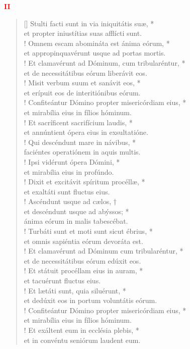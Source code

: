\begin{center}
\textcolor{red}{\bf II}
\end{center}
\begin{verse}[\versewidth]
Stulti facti sunt in via iniquitátis suæ, *\\
et propter iniustítias suas afflícti sunt.\\!
\vin Omnem escam abomináta est ánima eórum, *\\
\vin et appropinquavérunt usque ad portas mortis.\\!
Et clamavérunt ad Dóminum, cum tribularéntur, *\\
et de necessitátibus eórum liberávit eos.\\!
\vin Misit verbum suum et sanávit eos, *\\
\vin et erípuit eos de interitiónibus eórum.\\!
Confiteántur Dómino propter misericórdiam eius, *\\
et mirabília eius in fílios hóminum.\\!
\vin Et sacríficent sacrifícium laudis, *\\
\vin et annúntient ópera eius in exsultatióne.\\!
Qui descéndunt mare in návibus, *\\
faciéntes operatiónem in aquis multis.\\!
\vin Ipsi vidérunt ópera Dómini, *\\
\vin et mirabília eius in profúndo.\\!
Dixit et excitávit spíritum procéllæ, *\\
et exaltáti sunt fluctus eius.\\!
\vin Ascéndunt usque ad cælos, †\\
\vin et descéndunt usque ad abýssos; *\\
\vin ánima eórum in malis tabescébat.\\!
Turbáti sunt et moti sunt sicut ébrius, *\\
et omnis sapiéntia eórum devoráta est.\\!
\vin Et clamavérunt ad Dóminum cum tribularéntur, *\\
\vin et de necessitátibus eórum edúxit eos.\\!
Et státuit procéllam eius in auram, *\\
et tacuérunt fluctus eius.\\!
\vin Et lætáti sunt, quia siluérunt, *\\
\vin et dedúxit eos in portum voluntátis eórum.\\!
Confiteántur Dómino propter misericórdiam eius, *\\
et mirabília eius in fílios hóminum.\\!
\vin Et exáltent eum in ecclésia plebis, *\\
\vin et in convéntu seniórum laudent eum.\\
\end{verse}

